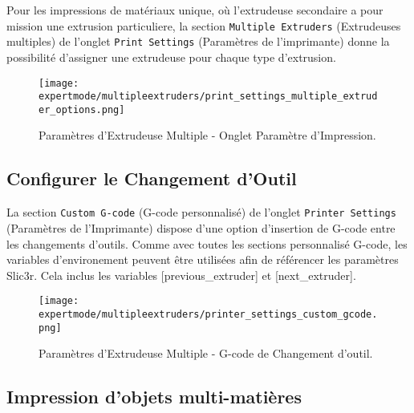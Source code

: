 Pour les impressions de mat\'eriaux unique, o\`u l'extrudeuse secondaire a pour mission une extrusion particuliere, la section \texttt{Multiple Extruders} (Extrudeuses multiples) de l'onglet \texttt{Print Settings} (Param\`etres de l'imprimante) donne la possibilit\'e d'assigner une extrudeuse pour chaque type d'extrusion.

\begin{figure}[H]
\centering
\texttt{[image: expertmode/multipleextruders/print\_settings\_multiple\_extruder\_options.png]}
\caption{Param\`etres d'Extrudeuse Multiple - Onglet Param\`etre d'Impression.}
\label{fig:advanced_multiple_extruder_options}
\end{figure}


\subsection{Configurer le Changement d'Outil} %
\label{sub:configuring_tool_changes}


La section \texttt{Custom G-code} (G-code personnalis\'e) de l'onglet \texttt{Printer Settings} (Param\`etres de l'Imprimante) dispose d'une option d'insertion de G-code entre les changements d'outils. Comme avec toutes les sections personnalis\'e G-code, les variables d'environement peuvent \^etre utilis\'ees afin de r\'ef\'erencer les param\`etres Slic3r.  Cela inclus les variables [previous\_extruder] et [next\_extruder].

\begin{figure}[H]
\centering
\texttt{[image: expertmode/multipleextruders/printer\_settings\_custom\_gcode.png]}
\caption{Param\`etres d'Extrudeuse Multiple - G-code de Changement d'outil.}
\label{fig:printer_settings_custom_gcode}
\end{figure}



\subsection{Impression d'objets multi-mati\`eres} %
\label{sub:printing_multi_material_objects}

